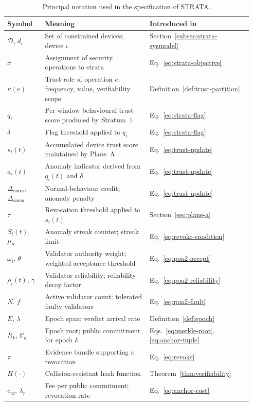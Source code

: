 \begin{table}[!htbp]
  \centering
  \footnotesize
  \setlength{\tabcolsep}{5pt}
  \renewcommand{\arraystretch}{1.25}
  \caption{Principal notation used in the specification of STRATA.}
  \label{tab:notation}
  \begin{tabularx}{\textwidth}{@{}
      >{\raggedright\arraybackslash}p{2.2cm}
      >{\raggedright\arraybackslash}X
      >{\raggedright\arraybackslash}p{2.6cm}@{}}
    \toprule
    \textbf{Symbol} & \textbf{Meaning} & \textbf{Introduced in} \\
    \midrule
    $\mathcal{D}$, $d_i$ & Set of constrained devices; device $i$ & Section~\ref{subsec:strata-sysmodel} \\
    $\sigma$ & Assignment of security operations to strata & Eq.~\eqref{eq:strata-objective} \\
    $\kappa(e)$ & Trust-role of operation $e$: frequency, value, verifiability scope & Definition~\ref{def:trust-partition} \\
    $q_i$ & Per-window behavioural trust score produced by Stratum~1 & Eq.~\eqref{eq:strata-flag} \\
    $\delta$ & Flag threshold applied to $q_i$ & Eq.~\eqref{eq:strata-flag} \\
    $s_i(t)$ & Accumulated device trust score maintained by Plane~A & Eq.~\eqref{eq:trust-update} \\
    $a_i(t)$ & Anomaly indicator derived from $q_i(t)$ and $\delta$ & Eq.~\eqref{eq:trust-update} \\
    $\Delta_{\mathrm{norm}}$, $\Delta_{\mathrm{anom}}$ & Normal-behaviour credit; anomaly penalty & Eq.~\eqref{eq:trust-update} \\
    $\tau$ & Revocation threshold applied to $s_i(t)$ & Section~\ref{sec:plane-a} \\
    $S_i(t)$, $\mu_S$ & Anomaly streak counter; streak limit & Eq.~\eqref{eq:revoke-condition} \\
    $\omega_i$, $\theta$ & Validator authority weight; weighted acceptance threshold & Eq.~\eqref{eq:poa2-accept} \\
    $\rho_i(t)$, $\gamma$ & Validator reliability; reliability decay factor & Eq.~\eqref{eq:poa2-reliability} \\
    $N$, $f$ & Active validator count; tolerated faulty validators & Eq.~\eqref{eq:poa2-fault} \\
    $E$, $\lambda$ & Epoch span; verdict arrival rate & Definition~\ref{def:epoch} \\
    $R_k$, $\mathcal{C}_k$ & Epoch root; public commitment for epoch $k$ & Eqs.~\eqref{eq:merkle-root}, \eqref{eq:anchor-tuple} \\
    $\pi$ & Evidence bundle supporting a revocation & Eq.~\eqref{eq:revoke} \\
    $H(\cdot)$ & Collision-resistant hash function & Theorem~\ref{thm:verifiability} \\
    $c_{\mathrm{tx}}$, $\lambda_r$ & Fee per public commitment; revocation rate & Eq.~\eqref{eq:anchor-cost} \\
    \bottomrule
  \end{tabularx}
\end{table}

